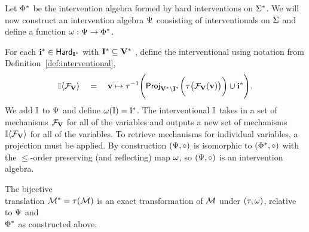 \documentclass[twoside,11pt]{article}
\begin{document}
\begin{remark}
Let $\hardintals^*$ be the intervention algebra formed by hard interventions on $\signature^*$. We will now construct an intervention algebra $\intals$ consisting of interventionals on $\signature$ and define a function $\intmap: \intals \to \hardintals^*$.

For each $\intpset^* \in \allints_{\intvars^*}$ with $\intvars^* \subseteq \allvars^*$ , define the interventional using notation from Definition~\ref{def:interventional},
\[\intal\langle \mechanism{\allvars}\rangle \ \ \ = \ \ \  \tset \mapsto \setmap^{-1}\Bigg(\Project{\setmap\big(\mechanism{\allvars}(\tset)\big)}{\allvars^* \setminus \intvars^* } \cup \intpset^* \Bigg).\]
We add $\intal$ to $\intals$ and define $\intmap(\intal) = \intpset^*$. The interventional $\intal$ takes in a set of mechanisms $\mechanism{\allvars}$ for all of the variables and outputs a new set of mechanisms $\intal\langle \mechanism{\allvars}\rangle$ for all of the variables. To retrieve mechanisms for individual variables, a projection must be applied. By construction $(\intals, \circ)$ is isomorphic to $(\hardintals^*, \circ)$ with the $\leq$-order preserving (and reflecting) map $\intmap$, so $(\intals, \circ)$ is an intervention algebra.
\end{remark}

\begin{theorem}\label{thm:bijexact}
 The bijective\\ translation $\model^* = \setmap(\model)$ is an exact transformation of $\model$ under $(\setmap, \intmap)$, relative to $\intals$ and\\ $\hardintals^*$ as constructed above.
\end{theorem}
\end{document}

